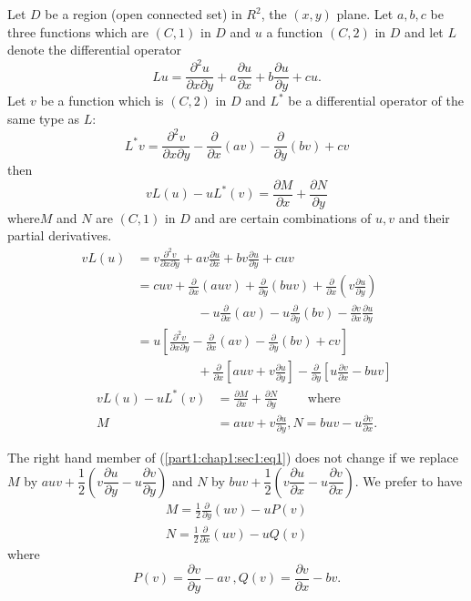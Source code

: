 Let $D$ be a region (open connected set) in $R^2$, the $(x,y)$
plane. Let $a,b,c$ be three functions which are $(C,1)$ in $D$ and $u$
a function $(C, 2)$ in $D$ and let $L$ denote the differential
operator 
$$
Lu=\frac{\partial^2 u}{\partial x \partial y} + a \frac{\partial
  u}{\partial x} + b \frac{\partial u}{\partial y} + cu. 
$$
Let $v$ be a function which is $(C, 2)$ in $D$ and $L^*$ be a
differential operator of the same type as $L$: 
$$
L^* v = \frac{\partial^2 v}{\partial x \partial y}-
\frac{\partial}{\partial x }(av) - \frac{\partial}{\partial y}(bv) +cv 
$$
then
\begin{equation}
vL(u) - uL^*(v) = \frac{\partial M}{\partial x}+ \frac{\partial
  N}{\partial y} \tag{1}\label{part1:chap1:sec1:eq1} 
\end{equation}
where\pageoriginale $M$ and $N$ are $(C, 1)$ in $D$ and are certain combinations of
$u, v$ and their partial derivatives. 
\begin{align*}
  v L(u) & = v \frac{\partial^2 v}{\partial x \partial y} + av
  \frac{\partial u}{\partial x}+bv \frac{\partial u}{\partial y} + cuv \\
  & = cuv + \frac{\partial }{\partial x}(auv) +
  \frac{\partial}{\partial y} (buv) + \frac{\partial}{\partial x} \left(v
  \frac{\partial u}{\partial y}\right)\\ 
  & \hspace{2cm}-u  \frac{\partial }{\partial x}(av) -u \frac{\partial}{\partial
    y} (bv) - \frac{\partial v}{\partial x} \frac{\partial u}{\partial
    y}\\ 
  & = u \left[ \frac{\partial^2 v}{\partial x \partial y}-
    \frac{\partial}{\partial x} (av) - \frac{\partial}{\partial
      y}(bv)+cv \right ]\\ 
  &  \hspace{2cm}+ \frac{\partial }{\partial x}\left [auv + v \frac{\partial
      u}{\partial y}\right ] -\frac{\partial}{\partial y}\left [ u
    \frac{\partial v}{\partial x}- buv \right] 
\end{align*}
\begin{align*}
 vL(u)-uL^* (v) & = \frac{\partial M}{\partial x}+\frac{\partial
    N}{\partial y} \qquad \text{ where }\\ 
 M & = auv + v \frac{\partial u}{\partial y}, N = buv - u \frac{\partial
  v}{\partial x}. 
\end{align*}

The right hand member of (\ref{part1:chap1:sec1:eq1}) does not change
if we replace $M$ by 
$auv +\dfrac{1}{2}(v \dfrac{\partial u}{\partial y}-u \dfrac{\partial
  v}{\partial y})$ and $N$ by $buv +\dfrac{1}{2}(v \dfrac{\partial
  u}{\partial x}-u \dfrac{\partial v}{\partial x})$. We prefer to have 
\begin{align*}
  M=\frac{1}{2} \frac{\partial}{\partial y}(uv)-u P(v)
  \tag{i}\label{part1:chap1:sec1:eqi} \\
  N=\frac{1}{2} \frac{\partial}{\partial x}(uv)-u Q(v)
  \tag{ii}\label{part1:chap1:sec1:eqii} 
\end{align*}
where 
$$
P(v) = \frac{\partial v}{\partial y}- av~, Q(v)= \frac{\partial
  v}{\partial x} - bv. 
$$

